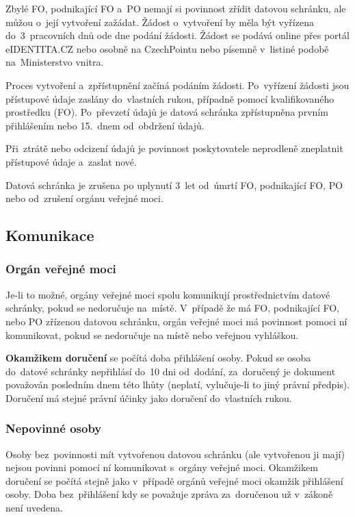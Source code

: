Zbylé FO, podnikající FO a~PO nemají si povinnost zřídit datovou schránku, ale můžou o~její vytvoření zažádat. Žádost o~vytvoření by měla být vyřízena do~3~pracovních dnů ode dne podání žádosti. Žádost se podává online přes portál eIDENTITA.CZ nebo osobně na CzechPointu nebo písemně v~listiné podobě na~Ministerstvo vnitra.

Proces vytvoření a~zpřístupnění začíná podáním žádosti. Po~vyřízení žádosti jsou přístupové údaje zaslány do~vlastních rukou, případně pomocí kvalifikovaného prostředku (FO). Po~převzetí údajů je datová schránka zpřístupněna prvním přihlášením nebo 15.~dnem od~obdržení údajů.

Při~ztrátě nebo odcizení údajů je povinnost poskytovatele neprodleně zneplatnit přístupové údaje a~zaslat nové.

Datová schránka je zrušena po uplynutí 3~let od~úmrtí FO, podnikající FO, PO nebo od~zrušení orgánu veřejné moci.

\subsection{Komunikace}

\subsubsection{Orgán veřejné moci}

Je-li to možné, orgány veřejné moci spolu komunikují prostřednictvím datové schránky, pokud se nedoručuje na~místě. V~případě že má FO, podnikající FO, nebo PO zřízenou datovou schránku, orgán veřejné moci má povinnost pomoci ní komunikovat, pokud se nedoručuje na místě nebo veřejnou vyhláškou.

\textbf{Okamžikem doručení} se počítá doba přihlášení osoby. Pokud se osoba do~datové schránky nepřihlásí do~10 dni od~dodání, za~doručený je dokument považován posledním dnem této lhůty (neplatí, vylučuje-li to jiný právní předpis). Doručení má stejné právní účinky jako doručení do~vlastních rukou.

\subsubsection{Nepovinné osoby}

Osoby bez~povinnosti mít vytvořenou datovou schránku (ale vytvořenou ji mají) nejsou povinni pomocí ní komunikovat s~orgány veřejné moci. Okamžikem doručení se počítá stejně jako v~případě orgánů veřejné moci okamžik přihlášení osoby. Doba bez~přihlášení kdy se považuje zpráva za~doručenou už v~zákoně není uvedena.

